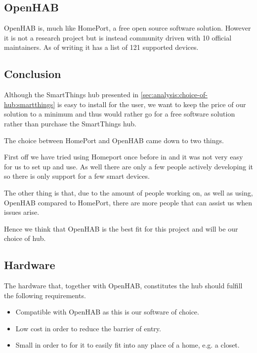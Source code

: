 \subsection{OpenHAB}
\label{sec:analysis:choice-of-hub:openhab}

OpenHAB\cite{OPENHAB} is, much like HomePort, a free open source software solution.
However it is not a research project but is instead community driven with 10 official maintainers\cite{openhab:maintainers}.
As of writing it has a list of 121 supported devices\cite{openhab:supported-technologies}.

\subsection{Conclusion}
\label{sec:analysis:choice-of-hub:conclusion}

Although the SmartThings hub presented in \cref{sec:analysis:choice-of-hub:smartthings} is easy to install for the user, we want to keep the price of our solution to a minimum and thus would rather go for a free software solution rather than purchase the SmartThings hub.

The choice between HomePort and OpenHAB came down to two things.

First off we have tried using Homeport once before in \cite{previous-report} and it was not very easy for us to set up and use.
As well there are only a few people actively developing it so there is only support for a few smart devices.

The other thing is that, due to the amount of people working on, as well as using, OpenHAB compared to HomePort, there are more people that can assist us when issues arise.

Hence we think that OpenHAB is the best fit for this project and will be our choice of hub.

\subsection{Hardware}

The hardware that, together with OpenHAB, constitutes the hub should fulfill the following requirements.

\begin{itemize}
\item Compatible with OpenHAB as this is our software of choice.
\item Low cost in order to reduce the barrier of entry.
\item Small in order to for it to easily fit into any place of a home, e.g. a closet.
\end{itemize}

